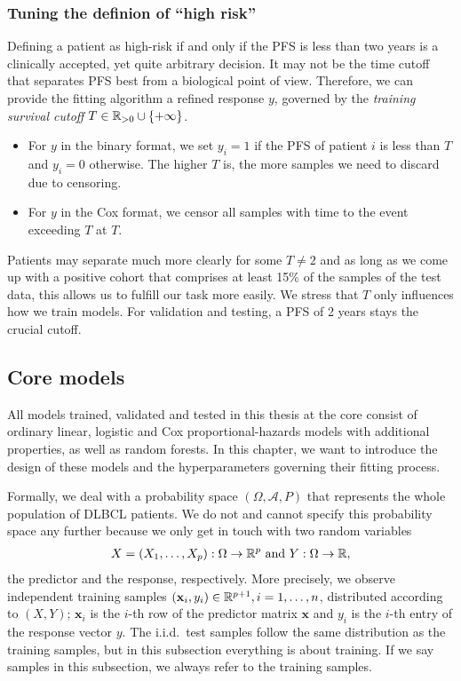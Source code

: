 \subsubsection{Tuning the definion of ``high risk''}

Defining a patient as high-risk if and only if the PFS is less than two years
is a clinically accepted, yet quite arbitrary decision. It may not be the time cutoff that 
separates PFS best from a biological point of view. Therefore, we can provide the fitting 
algorithm a refined response $y$, governed by the \textit{training survival cutoff} $T \in 
\mathbb{R}_{> 0} \cup \{ +\infty \}$.
\begin{itemize}
    \item For $y$ in the binary format, we set $y_i = 1$ if the PFS 
        of patient $i$ is less than $T$ and $y_i = 0$ otherwise. The higher $T$ is, the more 
        samples we need to discard due to censoring.
    \item For $y$ in the Cox format, we censor all samples with time to the event exceeding $T$ at 
        $T$.
\end{itemize}
Patients may separate much more clearly for some $T \neq 2$ and as long as we come up 
with a positive cohort that comprises at least 15\% of the samples of the test data, this allows us 
to fulfill our task more easily. We stress that $T$ only influences how we train models. For 
validation and testing, a PFS of \num{2} years stays the crucial cutoff.

\subsection{Core models}\label{subsec:core-models}

All models trained, validated and tested in this thesis at the core consist of ordinary linear, 
logistic and Cox proportional-hazards models with additional properties, as well as random forests.
In this chapter, we want to introduce the design of these models and the hyperparameters governing 
their fitting process.

Formally, we deal with a probability space $(\Omega, \mathcal{A}, P)$ that represents the whole 
population of DLBCL patients. We do not and cannot specify this probability space any further because 
we only get in touch with two random variables 
\begin{align}
    X = (X_1, \ldots, X_p): \Omega \to \mathbb{R}^p \text{ and } Y: \Omega \to \mathbb{R},
\end{align}
the predictor and the response, respectively. More 
precisely, we observe independent training samples $(\mathbf{x}_i, y_i) \in \mathbb{R}^{p+1}, i = 1, \ldots, n$, 
distributed according to $(X, Y)$; $\mathbf{x}_i$ is the $i$-th row of the predictor matrix $\mathbf{x}$ and
$y_i$ is the $i$-th entry of the response vector $y$. The i.i.d.\ test samples follow the same 
distribution as the training samples, but in this subsection everything is about training. If we 
say samples in this subsection, we always refer to the training samples.

